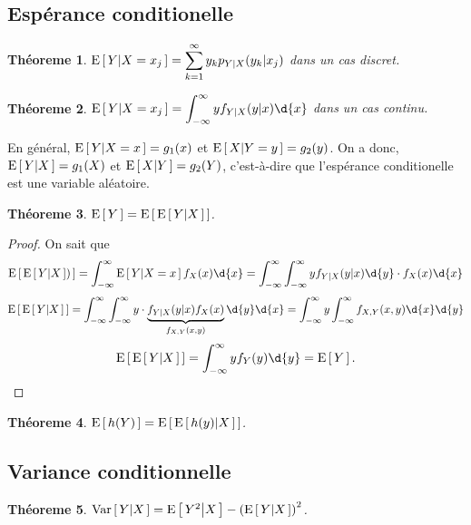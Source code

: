\documentclass[11pt]{article}
\newcommand\Esp[1]{%
	\ensuremath{%
		\mathrm{E}\left[\,#1\,\right]%
	}%
}%
\newcommand\Espg[2]{%
	\ensuremath{%
		\mathrm{E}\left[\,#1\middle\vert#2\,\right]%
	}%
}%
\newcommand\Varg[2]{%
	\ensuremath{%
		\mathrm{Var}\left[\,#1\middle\vert#2\,\right]%
	}%
}%
\newtheorem{theoreme}{Théoreme}[section]
\begin{document}
\subsection{Espérance conditionelle}
\begin{theoreme}
	$\Espg{Y}{X=x_j}=\displaystyle\sum_{k=1}^\infty y_kp_{Y|X}(y_k|x_j)$
	dans un cas discret.
\end{theoreme}

\begin{theoreme}
	$\Espg{Y}{X=x_j}=\displaystyle\int_{-\infty}^\infty yf_{Y|X}(y|x)\d{x}$
	dans un cas continu.
\end{theoreme}

En général, $\Espg{Y}{X=x}=g_1(x)$ et $\Espg{X}{Y=y}=g_2(y)$. On a donc,
$\Espg{Y}{X}=g_1(X)$ et $\Espg{X}{Y}=g_2(Y)$, c'est-à-dire que l'espérance
conditionelle est une variable aléatoire.

\begin{theoreme}
	$\Esp{Y}=\Esp{\Espg{Y}{X}}$.
\end{theoreme}

\begin{proof}
	On sait que
	\begin{equation*}
		\Esp{\Espg{Y}{X})}
		=\int_{-\infty}^\infty\Espg{Y}{X=x}f_X(x)\d{x}
		=\int_{-\infty}^\infty\int_{-\infty}^\infty
         yf_{Y|X}(y|x)\d{y}\cdot f_X(x)\d{x}
	\end{equation*}
	\begin{equation*}
		\Esp{\Espg{Y}{X}}
		=\int_{-\infty}^\infty\int_{-\infty}^\infty
		 y\cdot\underbrace{f_{Y|X}(y|x)f_X(x)}_{f_{X,Y}(x,y)}\d{y}\d{x}
		=\int_{-\infty}^\infty y\int_{-\infty}^\infty
         f_{X,Y}(x,y)\d{x}\d{y}
	\end{equation*}
	\begin{equation*}
		\Esp{\Espg{Y}{X}}
		=\int_{-\infty}^\infty yf_Y(y)\d{y}
		=\Esp{Y}.\qedhere
	\end{equation*}
\end{proof}

\begin{theoreme}
	$\Esp{h(Y)}=\Esp{\Espg{h(y)}{X}}$.
\end{theoreme}

\subsection{Variance conditionnelle}

\begin{theoreme}
	$\Varg{Y}{X}=\Espg{Y^2}{X}-\left(\Espg{Y}{X}\right)^2$.
\end{theoreme}
\end{document}
